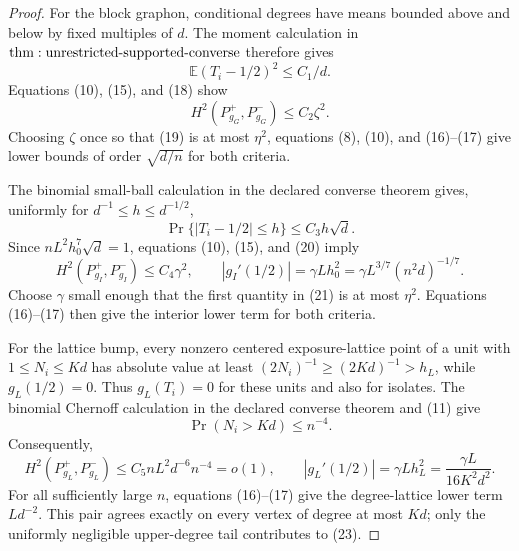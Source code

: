 \documentclass{article}
\begin{document}
\begin{proof}
For the block graphon, conditional degrees have means bounded above and below by fixed multiples of \(d\).  The moment calculation in \({\rm thm:unrestricted\text{-}supported\text{-}converse}\) therefore gives
\[
 \mathbb E(T_i-1/2)^2\leq C_1/d.
\tag{18}
\]
Equations (10), (15), and (18) show
\[
 H^2(P_{g_G}^+,P_{g_G}^-)
 \leq C_2\zeta^2.
\tag{19}
\]
Choosing \(\zeta\) once so that (19) is at most \(\eta^2\), equations (8), (10), and (16)--(17) give lower bounds of order \(\sqrt{d/n}\) for both criteria.

The binomial small-ball calculation in the declared converse theorem gives, uniformly for \(d^{-1}\leq h\leq d^{-1/2}\),
\[
 \Pr\{|T_i-1/2|\leq h\}\leq C_3h\sqrt d.
\tag{20}
\]
Since \(nL^2h_0^7\sqrt d=1\), equations (10), (15), and (20) imply
\[
 H^2(P_{g_I}^+,P_{g_I}^-)
 \leq C_4\gamma^2,\qquad
 |g_I'(1/2)|=\gamma Lh_0^2
 =\gamma L^{3/7}(n^2d)^{-1/7}.
\tag{21}
\]
Choose \(\gamma\) small enough that the first quantity in (21) is at most \(\eta^2\).  Equations (16)--(17) then give the interior lower term for both criteria.

For the lattice bump, every nonzero centered exposure-lattice point of a unit with \(1\leq N_i\leq Kd\) has absolute value at least \((2N_i)^{-1}\geq(2Kd)^{-1}>h_L\), while \(g_L(1/2)=0\).  Thus \(g_L(T_i)=0\) for these units and also for isolates.  The binomial Chernoff calculation in the declared converse theorem and (11) give
\[
 \Pr(N_i>Kd)\leq n^{-4}.
\tag{22}
\]
Consequently,
\[
 H^2(P_{g_L}^+,P_{g_L}^-)
 \leq C_5nL^2d^{-6}n^{-4}=o(1),\qquad
 |g_L'(1/2)|=\gamma Lh_L^2
 =\frac{\gamma L}{16K^2d^2}.
\tag{23}
\]
For all sufficiently large \(n\), equations (16)--(17) give the degree-lattice lower term \(Ld^{-2}\).  This pair agrees exactly on every vertex of degree at most \(Kd\); only the uniformly negligible upper-degree tail contributes to (23).


\end{proof}
\end{document}
